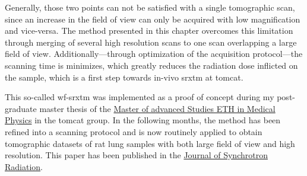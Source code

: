 Generally, those two points can not be satisfied with a single tomographic scan, since an increase in the field of view can only be acquired with low magnification and vice-versa. The method presented in this chapter overcomes this limitation through merging of several high resolution scans to one scan overlapping a large field of view. Additionally---through optimization of the acquisition protocol---the scanning time is minimizes, which greatly reduces the radiation dose inflicted on the sample, which is a first step towards in-vivo \ac{srxtm} at \ac{tomcat}.

This so-called \ac{wf-srxtm} was implemented as a proof of concept during my post-graduate master thesis of the \href{http://www.biomed.ee.ethz.ch/nds/}{Master of advanced Studies ETH in Medical Physics} in the \ac{tomcat} group. In the following months, the method has been refined into a scanning protocol and is now routinely applied to obtain tomographic datasets of rat lung samples with both large field of view and high resolution. This paper has been published in the \href{http://journals.iucr.org/s/}{Journal of Synchrotron Radiation}.